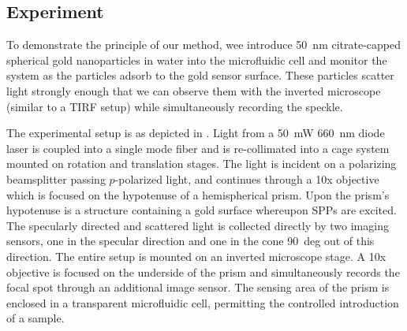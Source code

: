 %
%
%
%
%
%
%


\subsection{Experiment}
To demonstrate the principle of our method, wee introduce
\SI{50}{\nano\meter} citrate-capped spherical gold nanoparticles in water
into the microfluidic cell and monitor the system as the particles adsorb
to the gold sensor surface.  These particles scatter light strongly enough
that we can observe them with the inverted microscope (similar to a TIRF
setup) while simultaneously recording the speckle. 

The experimental setup is as depicted in .  Light from
a \SI{50}{\milli\watt} \SI{660}{\nano\meter} diode laser is coupled into a
single mode fiber and is re-collimated into a cage system mounted on
rotation and translation stages.  The light is incident on a polarizing
beamsplitter passing $p$-polarized light, and continues through a 10x
objective which is focused on the hypotenuse of a hemispherical prism.
Upon the prism's hypotenuse is a structure containing a gold surface
whereupon SPPs are excited.  The specularly directed and scattered light is
collected directly by two imaging sensors, one in the specular direction
and one in the cone \SI{90}{deg} out of this direction.  The entire setup
is mounted on an inverted microscope stage.  A 10x objective is focused on
the underside of the prism and simultaneously records the focal spot
through an additional image sensor.  The sensing area of the prism is
enclosed in a transparent microfluidic cell, permitting the controlled
introduction of a sample.

